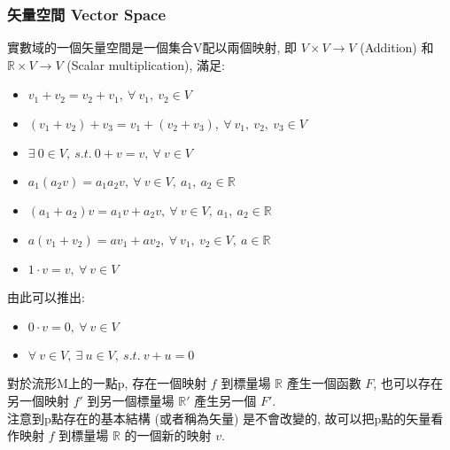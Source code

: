 \documentclass{article}
\begin{document}
\begin{CJK}{UTF8}{bsmi}
\subsubsection{矢量空間 Vector Space}
實數域的一個矢量空間是一個集合V配以兩個映射, 即 $V \times V \rightarrow V$ (Addition) 和 $\mathbb{R}\times V \rightarrow V $ (Scalar multiplication), 滿足:
\begin{itemize}
  \item $v_1+v_2=v_2+v_1,\ \forall \ v_1, \ v_2 \in V $
  \item $(v_1+v_2)+v_3=v_1+(v_2+v_3),\ \forall \ v_1,\ v_2,\ v_3 \in V$
  \item $\exists\  0\in V,\ s.t.\ 0+v=v,\ \forall \ v \in V$
  \item $a_1(a_2 v)=a_1 a_2 v,\ \forall\ v\in V ,\ a_1,\ a_2 \in \mathbb{R}$
  \item $(a_1+a_2)v=a_1 v+a_2 v,\ \forall\ v\in V ,\ a_1,\ a_2 \in \mathbb{R}$
  \item $a(v_1+v_2)=av_1+av_2,\ \forall\ v_1,\ v_2 \in V ,\ a \in \mathbb{R}$
  \item $1\cdot v=v,\ \forall \ v \in V$
\end{itemize}
由此可以推出:
\begin{itemize}
  \item $0 \cdot v=0,\ \forall\ v \in V$
  \item $\forall\ v \in V,\ \exists \ u \in V,\  s.t.\  v+u=0$
\end{itemize}
 對於流形M上的一點p, 存在一個映射 $f$ 到標量場 $\mathbb{R}$ 產生一個函數 $F$, 也可以存在另一個映射 $f'$ 到另一個標量場 $\mathbb{R}' $ 產生另一個 $F'$.
\\ 注意到p點存在的基本結構 (或者稱為矢量) 是不會改變的, 故可以把p點的矢量看作映射 $f$ 到標量場 $\mathbb{R}$ 的一個新的映射 $v$.

\end{CJK}
\end{document}
